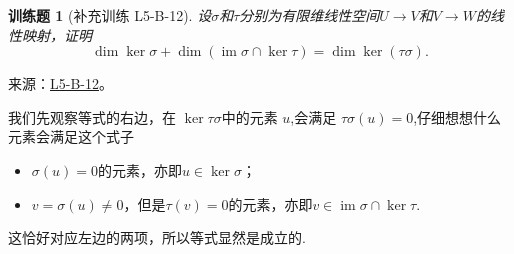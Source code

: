 \documentclass[UTF8,12pt,a4paper,fontset=fandol]{ctexart}
\newtheorem{exercise}{训练题}[section]
\begin{document}
\begin{exercise}[补充训练 L5-B-12]\label{prob:L5-B-12}
设$\sigma$和$\tau$分别为有限维线性空间$U\to V$和$V\to W$的线性映射，证明
        \[\dim\ker\sigma+\dim(\operatorname{im}\sigma\cap\ker\tau)=\dim\ker(\tau\sigma).\]
\end{exercise}
\noindent 来源：\href{https://github.com/yhwu-is/Linear-Algebra-Left-Undone/blob/new/%E8%AE%B2%E4%B9%89/%E4%B8%93%E9%A2%98/5%20%E7%BA%BF%E6%80%A7%E6%98%A0%E5%B0%84.tex}{L5-B-12}。
\begin{solve}
我们先观察等式的右边，在 $\ker \tau \sigma$中的元素 $u$,会满足 $\tau \sigma (u) = 0 $,仔细想想什么元素会满足这个式子
            \begin{itemize}
                \item $\sigma(u)=0$的元素，亦即$u\in \ker \sigma$；
                \item $v=\sigma(u)\neq 0$，但是$\tau(v)=0$的元素，亦即$v\in \operatorname{im} \sigma \cap \ker \tau$.
            \end{itemize}
            这恰好对应左边的两项，所以等式显然是成立的.
\end{solve}
\end{document}
